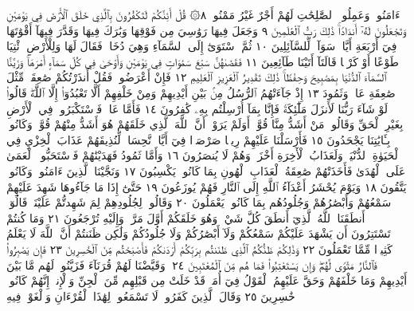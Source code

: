 ءَامَنُوا۟ وَعَمِلُوا۟ ٱلصَّٰلِحَٰتِ لَهُمْ أَجْرٌ غَيْرُ مَمْنُونࣲ ٨۞ قُلْ أَئِنَّكُمْ
لَتَكْفُرُونَ بِٱلَّذِي خَلَقَ ٱلْأَرْضَ فِي يَوْمَيْنِ وَتَجْعَلُونَ لَهُۥٓ أَندَادࣰاۚ
ذَٰلِكَ رَبُّ ٱلْعَٰلَمِينَ ٩ وَجَعَلَ فِيهَا رَوَٰسِيَ مِن فَوْقِهَا
وَبَٰرَكَ فِيهَا وَقَدَّرَ فِيهَآ أَقْوَٰتَهَا فِيٓ أَرْبَعَةِ أَيَّامࣲ سَوَآءࣰ
لِّلسَّآئِلِينَ ١٠ ثُمَّ ٱسْتَوَىٰٓ إِلَى ٱلسَّمَآءِ وَهِيَ دُخَانࣱ فَقَالَ
لَهَا وَلِلْأَرْضِ ٱئْتِيَا طَوْعًا أَوْ كَرْهࣰا قَالَتَآ أَتَيْنَا طَآئِعِينَ ١١
فَقَضَىٰهُنَّ سَبْعَ سَمَٰوَاتࣲ فِي يَوْمَيْنِ وَأَوْحَىٰ فِي كُلِّ سَمَآءٍ أَمْرَهَاۚ
وَزَيَّنَّا ٱلسَّمَآءَ ٱلدُّنْيَا بِمَصَٰبِيحَ وَحِفْظࣰاۚ ذَٰلِكَ تَقْدِيرُ ٱلْعَزِيزِ
ٱلْعَلِيمِ ١٢ فَإِنْ أَعْرَضُوا۟ فَقُلْ أَنذَرْتُكُمْ صَٰعِقَةࣰ مِّثْلَ صَٰعِقَةِ
عَادࣲ وَثَمُودَ ١٣ إِذْ جَآءَتْهُمُ ٱلرُّسُلُ مِنۢ بَيْنِ أَيْدِيهِمْ وَمِنْ
خَلْفِهِمْ أَلَّا تَعْبُدُوٓا۟ إِلَّا ٱللَّهَۖ قَالُوا۟ لَوْ شَآءَ رَبُّنَا لَأَنزَلَ مَلَٰٓئِكَةࣰ
فَإِنَّا بِمَآ أُرْسِلْتُم بِهِۦ كَٰفِرُونَ ١٤ فَأَمَّا عَادࣱ فَٱسْتَكْبَرُوا۟ فِي
ٱلْأَرْضِ بِغَيْرِ ٱلْحَقِّ وَقَالُوا۟ مَنْ أَشَدُّ مِنَّا قُوَّةًۖ أَوَلَمْ يَرَوْا۟ أَنَّ ٱللَّهَ
ٱلَّذِي خَلَقَهُمْ هُوَ أَشَدُّ مِنْهُمْ قُوَّةࣰۖ وَكَانُوا۟ بِـَٔايَٰتِنَا يَجْحَدُونَ ١٥
فَأَرْسَلْنَا عَلَيْهِمْ رِيحࣰا صَرْصَرࣰا فِيٓ أَيَّامࣲ نَّحِسَاتࣲ لِّنُذِيقَهُمْ
عَذَابَ ٱلْخِزْيِ فِي ٱلْحَيَوٰةِ ٱلدُّنْيَاۖ وَلَعَذَابُ ٱلْأٓخِرَةِ أَخْزَىٰۖ وَهُمْ
لَا يُنصَرُونَ ١٦ وَأَمَّا ثَمُودُ فَهَدَيْنَٰهُمْ فَٱسْتَحَبُّوا۟ ٱلْعَمَىٰ عَلَى
ٱلْهُدَىٰ فَأَخَذَتْهُمْ صَٰعِقَةُ ٱلْعَذَابِ ٱلْهُونِ بِمَا كَانُوا۟ يَكْسِبُونَ ١٧
وَنَجَّيْنَا ٱلَّذِينَ ءَامَنُوا۟ وَكَانُوا۟ يَتَّقُونَ ١٨ وَيَوْمَ يُحْشَرُ أَعْدَآءُ ٱللَّهِ
إِلَى ٱلنَّارِ فَهُمْ يُوزَعُونَ ١٩ حَتَّىٰٓ إِذَا مَا جَآءُوهَا شَهِدَ عَلَيْهِمْ
سَمْعُهُمْ وَأَبْصَٰرُهُمْ وَجُلُودُهُم بِمَا كَانُوا۟ يَعْمَلُونَ ٢٠
وَقَالُوا۟ لِجُلُودِهِمْ لِمَ شَهِدتُّمْ عَلَيْنَاۖ قَالُوٓا۟ أَنطَقَنَا ٱللَّهُ ٱلَّذِيٓ
أَنطَقَ كُلَّ شَيْءࣲۚ وَهُوَ خَلَقَكُمْ أَوَّلَ مَرَّةࣲ وَإِلَيْهِ تُرْجَعُونَ ٢١
وَمَا كُنتُمْ تَسْتَتِرُونَ أَن يَشْهَدَ عَلَيْكُمْ سَمْعُكُمْ وَلَآ أَبْصَٰرُكُمْ
وَلَا جُلُودُكُمْ وَلَٰكِن ظَنَنتُمْ أَنَّ ٱللَّهَ لَا يَعْلَمُ كَثِيرࣰا مِّمَّا تَعْمَلُونَ ٢٢
وَذَٰلِكُمْ ظَنُّكُمُ ٱلَّذِي ظَنَنتُم بِرَبِّكُمْ أَرْدَىٰكُمْ فَأَصْبَحْتُم
مِّنَ ٱلْخَٰسِرِينَ ٢٣ فَإِن يَصْبِرُوا۟ فَٱلنَّارُ مَثْوࣰى لَّهُمْۖ وَإِن يَسْتَعْتِبُوا۟
فَمَا هُم مِّنَ ٱلْمُعْتَبِينَ ٢٤۞ وَقَيَّضْنَا لَهُمْ قُرَنَآءَ فَزَيَّنُوا۟ لَهُم
مَّا بَيْنَ أَيْدِيهِمْ وَمَا خَلْفَهُمْ وَحَقَّ عَلَيْهِمُ ٱلْقَوْلُ فِيٓ أُمَمࣲ قَدْ
خَلَتْ مِن قَبْلِهِم مِّنَ ٱلْجِنِّ وَٱلْإِنسِۖ إِنَّهُمْ كَانُوا۟ خَٰسِرِينَ ٢٥
وَقَالَ ٱلَّذِينَ كَفَرُوا۟ لَا تَسْمَعُوا۟ لِهَٰذَا ٱلْقُرْءَانِ وَٱلْغَوْا۟ فِيهِ
